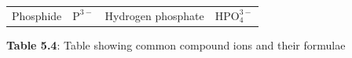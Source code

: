 {{\begin{center}
\begin{tabular}[t]{|l|l|l|l|}
    
        Phosphide &
    
    
        \begin{math}{\mathrm{P}}^{3-}\end{math} &
    
    
        Hydrogen phosphate &
    
    
        \begin{math}\mathrm{HPO}_{4}^{3-}\end{math}%
     \tabularnewline\cline{1-1}\cline{2-2}\cline{3-3}\cline{4-4}
    \end{tabular}
      \end{center}
    \begin{center}{\small\bfseries Table 5.4}: Table showing common compound ions and their formulae\end{center}
    
    \addtocounter{footnote}{-0}
    
          }{ %
        
    
        \begin{center}
      
      \label{m38689*uid99}
      
    \noindent
      \tablelasttail{}
      \begin{xtabular}[t]{|l|l|l|l|}\hline
    

\end{xtabular}
\end{center}}}
